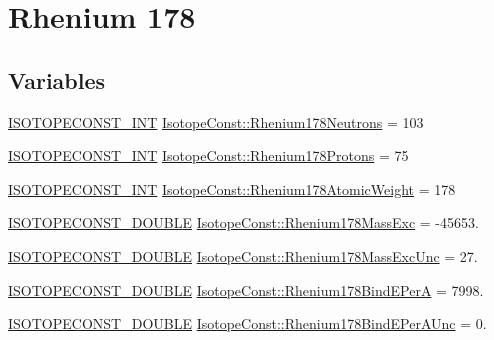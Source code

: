 \hypertarget{group___isotope_const-_rhenium-_re178}{}\section{Rhenium 178}
\label{group___isotope_const-_rhenium-_re178}
\subsection*{Variables}
\begin{DoxyCompactItemize}
\item 
\mbox{\hyperlink{group___isotope_const-_macros_ga5f18360b3e99483a35c32d789e62621c}{I\+S\+O\+T\+O\+P\+E\+C\+O\+N\+S\+T\+\_\+\+I\+NT}} \mbox{\hyperlink{group___isotope_const-_rhenium-_re178_gac9e94ecd2246600af9c36324be3462f5}{Isotope\+Const\+::\+Rhenium178\+Neutrons}} = 103
\item 
\mbox{\hyperlink{group___isotope_const-_macros_ga5f18360b3e99483a35c32d789e62621c}{I\+S\+O\+T\+O\+P\+E\+C\+O\+N\+S\+T\+\_\+\+I\+NT}} \mbox{\hyperlink{group___isotope_const-_rhenium-_re178_ga0aea92ba88e0dd415e1ff6c8df31ca54}{Isotope\+Const\+::\+Rhenium178\+Protons}} = 75
\item 
\mbox{\hyperlink{group___isotope_const-_macros_ga5f18360b3e99483a35c32d789e62621c}{I\+S\+O\+T\+O\+P\+E\+C\+O\+N\+S\+T\+\_\+\+I\+NT}} \mbox{\hyperlink{group___isotope_const-_rhenium-_re178_ga3ae407332220081c5ae2e26d67fc500e}{Isotope\+Const\+::\+Rhenium178\+Atomic\+Weight}} = 178
\item 
\mbox{\hyperlink{group___isotope_const-_macros_ga8f45a7272ce02c0b4c65c44636ed719a}{I\+S\+O\+T\+O\+P\+E\+C\+O\+N\+S\+T\+\_\+\+D\+O\+U\+B\+LE}} \mbox{\hyperlink{group___isotope_const-_rhenium-_re178_ga1ec4dd84a23ef1518d643be5cad525b4}{Isotope\+Const\+::\+Rhenium178\+Mass\+Exc}} = -\/45653.
\item 
\mbox{\hyperlink{group___isotope_const-_macros_ga8f45a7272ce02c0b4c65c44636ed719a}{I\+S\+O\+T\+O\+P\+E\+C\+O\+N\+S\+T\+\_\+\+D\+O\+U\+B\+LE}} \mbox{\hyperlink{group___isotope_const-_rhenium-_re178_ga613044f385ca0fa306cb3171c2bb019b}{Isotope\+Const\+::\+Rhenium178\+Mass\+Exc\+Unc}} = 27.
\item 
\mbox{\hyperlink{group___isotope_const-_macros_ga8f45a7272ce02c0b4c65c44636ed719a}{I\+S\+O\+T\+O\+P\+E\+C\+O\+N\+S\+T\+\_\+\+D\+O\+U\+B\+LE}} \mbox{\hyperlink{group___isotope_const-_rhenium-_re178_ga991c02b96b7b90fd09d1bc620ea5332e}{Isotope\+Const\+::\+Rhenium178\+Bind\+E\+PerA}} = 7998.
\item 
\mbox{\hyperlink{group___isotope_const-_macros_ga8f45a7272ce02c0b4c65c44636ed719a}{I\+S\+O\+T\+O\+P\+E\+C\+O\+N\+S\+T\+\_\+\+D\+O\+U\+B\+LE}} \mbox{\hyperlink{group___isotope_const-_rhenium-_re178_gaa4046d1d96fd3dad9dd1c257983a3e68}{Isotope\+Const\+::\+Rhenium178\+Bind\+E\+Per\+A\+Unc}} = 0.

\end{DoxyCompactItemize}
